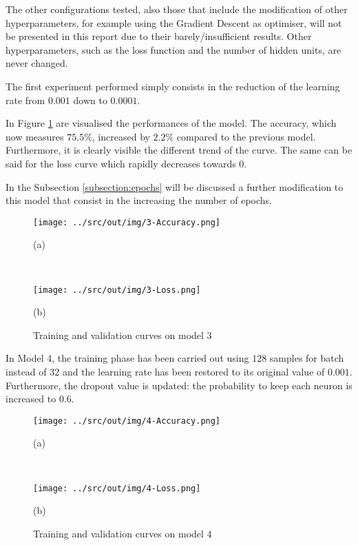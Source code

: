 \documentclass[a4paper,12pt]{article} %
\begin{document}
	The other configurations tested, also those that include the modification 
	of other hyperparameters, for example using the Gradient Descent as 
	optimiser, will not be presented in this report due to their 
	barely/insufficient results. Other hyperparameters, such as the loss 
	function and the number of hidden units, are never changed. 
	\newline

	The first experiment performed simply consists in the reduction of the 
	learning rate from $0.001$ down to $0.0001$. 
	
	In Figure \ref{fig:model3-performance} are visualised the performances of 
	the model. The accuracy, which now measures $75.5\%$, increased by $2.2\%$ 
	compared to the previous model. Furthermore, it is clearly visible the 
	different trend of the curve. 
	The same can be said for the loss curve which rapidly decreases towards $0$.
	
	In the Subsection \ref{subsection:epochs} will be discussed a further 
	modification to this model that consist in the increasing the number 
	of epochs.

	\begin{figure}[htb]
		\begin{minipage}[c]{.49\textwidth}
			\centering
			\texttt{[image: ../src/out/img/3-Accuracy.png]}
			\caption*{(a)}
		\end{minipage}
		~
		\begin{minipage}[c]{.49\textwidth}
			\centering
			\texttt{[image: ../src/out/img/3-Loss.png]}
			\caption*{(b)}
		\end{minipage}
		\caption{Training and validation curves on model 3}
		\label{fig:model3-performance}
	\end{figure}
	
	In Model 4, the training phase has been carried out using $128$ samples 
	for batch instead of $32$ and the learning rate has been restored to its 
	original value of $0.001$. 
	Furthermore, the dropout value is updated: the probability to keep each 
	neuron is increased to $0.6$. 
		
	\begin{figure}[htb]
		\begin{minipage}[c]{.49\textwidth}
			\centering
			\texttt{[image: ../src/out/img/4-Accuracy.png]}
			\caption*{(a)}
		\end{minipage}
		~
		\begin{minipage}[c]{.49\textwidth}
			\centering
			\texttt{[image: ../src/out/img/4-Loss.png]}
			\caption*{(b)}
		\end{minipage}
		\caption{Training and validation curves on model 4}
		\label{fig:model4-performance}
	\end{figure}
\end{document}
